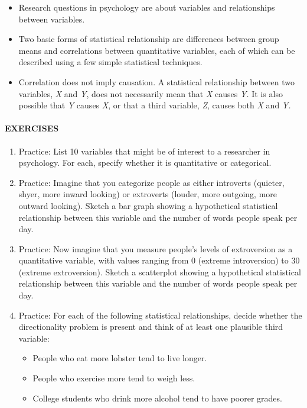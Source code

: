\documentclass[
]{krantz}
\providecommand{\tightlist}{%
  \setlength{\itemsep}{0pt}\setlength{\parskip}{0pt}}
\begin{document}
\begin{itemize}
\tightlist
\item
  Research questions in psychology are about variables and relationships between variables.
\item
  Two basic forms of statistical relationship are differences between group means and correlations between quantitative variables, each of which can be described using a few simple statistical techniques.
\item
  Correlation does not imply causation. A statistical relationship between two variables, \emph{X} and \emph{Y}, does not necessarily mean that \emph{X} causes \emph{Y.} It is also possible that \emph{Y} causes \emph{X}, or that a third variable, \emph{Z}, causes both \emph{X} and \emph{Y.}
\end{itemize}

\paragraph*{EXERCISES}\label{exercises-4}

\begin{enumerate}
\def\labelenumi{\arabic{enumi}.}
\tightlist
\item
  Practice: List 10 variables that might be of interest to a researcher in psychology. For each, specify whether it is quantitative or categorical.
\item
  Practice: Imagine that you categorize people as either introverts (quieter, shyer, more inward looking) or extroverts (louder, more outgoing, more outward looking). Sketch a bar graph showing a hypothetical statistical relationship between this variable and the number of words people speak per day.
\item
  Practice: Now imagine that you measure people's levels of extroversion as a quantitative variable, with values ranging from 0 (extreme introversion) to 30 (extreme extroversion). Sketch a scatterplot showing a hypothetical statistical relationship between this variable and the number of words people speak per day.
\item
  Practice: For each of the following statistical relationships, decide whether the directionality problem is present and think of at least one plausible third variable:

  \begin{itemize}
  \tightlist
  \item
    People who eat more lobster tend to live longer.
  \item
    People who exercise more tend to weigh less.
  \item
    College students who drink more alcohol tend to have poorer grades.
  \end{itemize}
\end{enumerate}
\end{document}
